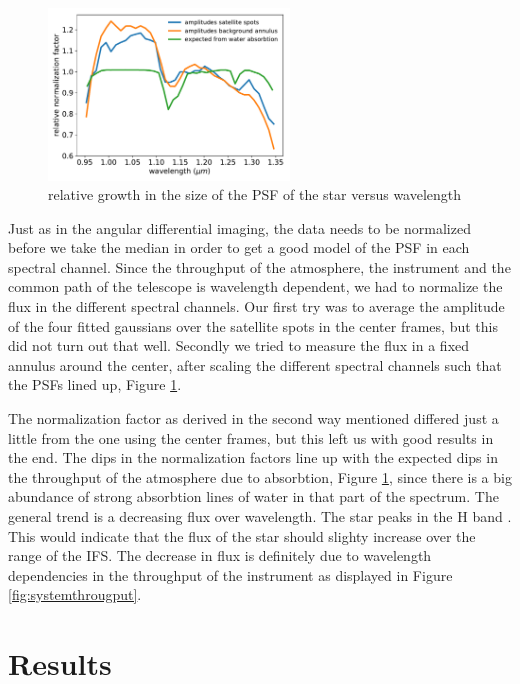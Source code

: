 \documentclass[twoside,single]{lion-msc}
\begin{document}
\begin{figure}
\centering
\includegraphics[width = 0.57\textwidth]{allnormalization}
\caption{relative growth in the size of the PSF of the star versus wavelength}
\label{fig:throughputnorm}
\end{figure}

\noindent
Just as in the angular differential imaging, the data needs to be normalized before we take the median in order to get a good model of the PSF in each spectral channel. Since the throughput of the atmosphere, the instrument and the common path of the telescope is wavelength dependent, we had to normalize the flux in the different spectral channels. Our first try was to average the amplitude of the four fitted gaussians over the satellite spots in the center frames, but this did not turn out that well. Secondly we tried to measure the flux in a fixed annulus around the center, after scaling the different spectral channels such that the PSFs lined up, Figure \ref{fig:throughputnorm}.
\bigskip

The normalization factor as derived in the second way mentioned differed just a little from the one using the center frames, but this left us with good results in the end. The dips in the normalization factors line up with the expected dips in the throughput of the atmosphere due to absorbtion, Figure \ref{fig:throughputnorm}, since there is a big abundance of strong absorbtion lines of water in that part of the spectrum. The general trend is a decreasing flux over wavelength. The star peaks in the H band \citep{Padgett}. This would indicate that the flux of the star should slighty increase over the range of the IFS. The decrease in flux is definitely due to wavelength dependencies in the throughput of the instrument as displayed in Figure \ref{fig:systemthrougput}. 

\chapter{Results}
\end{document}
